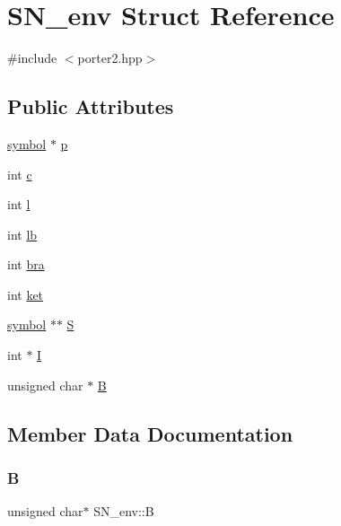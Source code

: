 \hypertarget{structSN__env}{}\section{S\+N\+\_\+env Struct Reference}
\label{structSN__env}


{\ttfamily \#include $<$porter2.\+hpp$>$}

\subsection*{Public Attributes}
\begin{DoxyCompactItemize}
\item 
\mbox{\hyperlink{porter2_8hpp_a04438e24473719aaf288c57833717164}{symbol}} $\ast$ \mbox{\hyperlink{structSN__env_a400280a08e61d3139b32bf9ac06eac59}{p}}
\item 
int \mbox{\hyperlink{structSN__env_a8b785d9fa1ff1610fe2b5d9e85207df6}{c}}
\item 
int \mbox{\hyperlink{structSN__env_aebb292b34aa233b42d32074e254dc754}{l}}
\item 
int \mbox{\hyperlink{structSN__env_a17fa8ef44090bbfd74755377b15194a7}{lb}}
\item 
int \mbox{\hyperlink{structSN__env_a9768d567ce5406809557aeb40cad873e}{bra}}
\item 
int \mbox{\hyperlink{structSN__env_a838739ee60904661873995471c80bac5}{ket}}
\item 
\mbox{\hyperlink{porter2_8hpp_a04438e24473719aaf288c57833717164}{symbol}} $\ast$$\ast$ \mbox{\hyperlink{structSN__env_aef140037972032bceeebebf53cc53d68}{S}}
\item 
int $\ast$ \mbox{\hyperlink{structSN__env_a73c996c34c706b1c11a4b3b273d99f35}{I}}
\item 
unsigned char $\ast$ \mbox{\hyperlink{structSN__env_a11c62ffd6547f724623fa5bab2114794}{B}}
\end{DoxyCompactItemize}


\subsection{Member Data Documentation}
\mbox{\label{structSN__env_a11c62ffd6547f724623fa5bab2114794}} 
\subsubsection{\texorpdfstring{B}{B}}
{\footnotesize\ttfamily unsigned char$\ast$ S\+N\+\_\+env\+::B}

